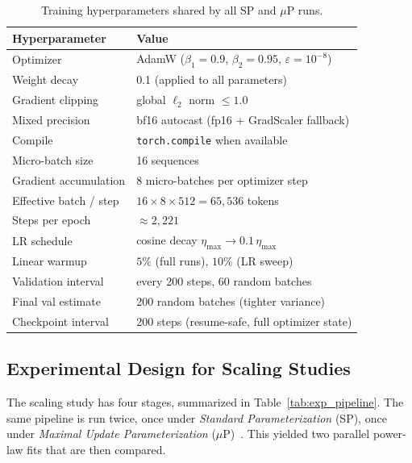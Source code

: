 \documentclass[a4paper]{article}
\begin{document}
\begin{table}[H]
\centering
\small
\begin{tabular}{ll}
\toprule
Hyperparameter & Value \\
\midrule
Optimizer                  & AdamW ($\beta_1{=}0.9$, $\beta_2{=}0.95$, $\varepsilon{=}10^{-8}$) \\
Weight decay               & 0.1 (applied to all parameters) \\
Gradient clipping          & global $\ell_2$ norm $\leq 1.0$ \\
Mixed precision            & bf16 autocast (fp16 + GradScaler fallback) \\
Compile                    & \texttt{torch.compile} when available \\
Micro-batch size           & 16 sequences \\
Gradient accumulation      & 8 micro-batches per optimizer step \\
Effective batch / step     & $16 \times 8 \times 512 = 65{,}536$ tokens \\
Steps per epoch            & $\approx 2{,}221$ \\
LR schedule                & cosine decay $\eta_{\max} \to 0.1\,\eta_{\max}$ \\
Linear warmup              & $5\%$ (full runs), $10\%$ (LR sweep) \\
Validation interval        & every 200 steps, 60 random batches \\
Final val estimate         & 200 random batches (tighter variance) \\
Checkpoint interval        & 200 steps (resume-safe, full optimizer state) \\
\bottomrule
\end{tabular}
\caption{Training hyperparameters shared by all SP and $\mu$P runs.}
\label{tab:train_hp}
\end{table}

\subsection{Experimental Design for Scaling Studies}

The scaling study has four stages, summarized in Table~\ref{tab:exp_pipeline}. The same pipeline is run twice, once under \emph{Standard Parameterization} (SP), once under \emph{Maximal Update Parameterization} ($\mu$P)~\cite{4}. This yielded two parallel power-law fits that are then compared.
\end{document}
